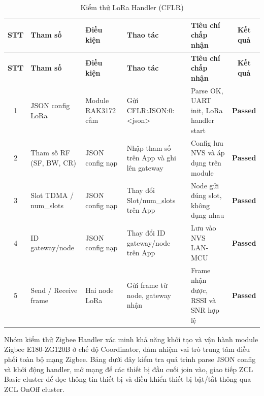         \begin{longtable}{|c|p{2cm}|p{2.5cm}|p{3.5cm}|p{4cm}|c|}
            \caption{Kiểm thử LoRa Handler (CFLR)}
            \label{tab:test_lora_handler} \\
            \hline
            \textbf{STT} & \textbf{Tham số} & \textbf{Điều kiện} & \textbf{Thao tác} & \textbf{Tiêu chí chấp nhận} & \textbf{Kết quả} \\ \hline
            \endfirsthead
            \hline
            \textbf{STT} & \textbf{Tham số} & \textbf{Điều kiện} & \textbf{Thao tác} & \textbf{Tiêu chí chấp nhận} & \textbf{Kết quả} \\ \hline
            \endhead
            \hline
            \endfoot
            \endlastfoot

            1 & JSON config LoRa & Module RAK3172 cắm & Gửi CFLR:JSON:0:\newline<json> & Parse OK, UART init, LoRa handler start & \textcolor{modern_blue}{\textbf{Passed}} \\ \hline
            2 & Tham số RF (SF, BW, CR) & JSON config nạp & Nhập tham số trên App và ghi lên gateway & Config lưu NVS và áp dụng trên module & \textcolor{modern_blue}{\textbf{Passed}} \\ \hline
            3 & Slot TDMA / num\_slots & JSON config nạp & Thay đổi Slot/num\_slots trên App & Node gửi đúng slot, không đụng nhau & \textcolor{modern_blue}{\textbf{Passed}} \\ \hline
            4 & ID gateway/node & JSON config nạp & Thay đổi ID gateway/node trên App & Lưu vào NVS LAN-MCU & \textcolor{modern_blue}{\textbf{Passed}} \\ \hline
            5 & Send / Receive frame & Hai node LoRa & Gửi frame từ node, gateway nhận & Frame nhận được, RSSI và SNR hợp lệ & \textcolor{modern_blue}{\textbf{Passed}} \\ \hline
        \end{longtable}

        Nhóm kiểm thử Zigbee Handler xác minh khả năng khởi tạo và vận hành module Zigbee E180-ZG120B ở chế độ Coordinator, đảm nhiệm vai trò trung tâm điều phối toàn bộ mạng Zigbee. Bảng dưới đây kiểm tra quá trình parse JSON config và khởi động handler, mở mạng để các thiết bị đầu cuối join vào, giao tiếp ZCL Basic cluster để đọc thông tin thiết bị và điều khiển thiết bị bật/tắt thông qua ZCL OnOff cluster.

